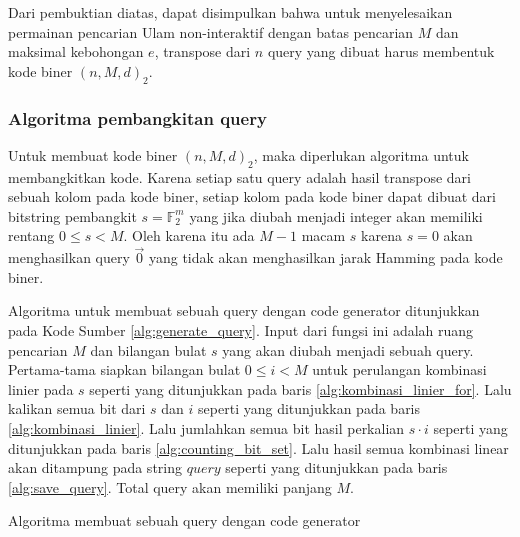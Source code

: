Dari pembuktian diatas, dapat disimpulkan bahwa untuk menyelesaikan permainan pencarian Ulam non-interaktif dengan batas pencarian $M$ dan maksimal kebohongan $e$, transpose dari $n$ query yang dibuat harus membentuk kode biner $(n,M,d)_2$.

\subsubsection{Algoritma pembangkitan query}

Untuk membuat kode biner $(n,M,d)_2$, maka diperlukan algoritma untuk membangkitkan kode. Karena setiap satu query adalah hasil transpose dari sebuah kolom pada kode biner, setiap kolom pada kode biner dapat dibuat dari bitstring pembangkit $s = \mathbb{F}_2^m$ yang jika diubah menjadi integer akan memiliki rentang $0 \leq s < M$. Oleh karena itu ada $M-1$ macam $s$ karena $s=0$ akan menghasilkan query $\vec{0}$ yang tidak akan menghasilkan jarak Hamming pada kode biner.

Algoritma untuk membuat sebuah query dengan code generator ditunjukkan pada Kode Sumber \ref{alg:generate_query}. Input dari fungsi ini adalah ruang pencarian $M$ dan bilangan bulat $s$ yang akan diubah menjadi sebuah query. Pertama-tama siapkan bilangan bulat $0 \leq i < M$ untuk perulangan kombinasi linier pada $s$ seperti yang ditunjukkan pada baris \ref{alg:kombinasi_linier_for}. Lalu kalikan semua bit dari $s$ dan $i$ seperti yang ditunjukkan pada baris \ref{alg:kombinasi_linier}. Lalu jumlahkan semua bit hasil perkalian $s \cdot i$ seperti yang ditunjukkan pada baris \ref{alg:counting_bit_set}. Lalu hasil semua kombinasi linear akan ditampung pada string $query$ seperti yang ditunjukkan pada baris \ref{alg:save_query}. Total query akan memiliki panjang $M$.

\begin{algorithm}[h]
\caption{Algoritma membuat sebuah query dengan code generator}
\label{alg:generate_query}
\end{algorithm}


